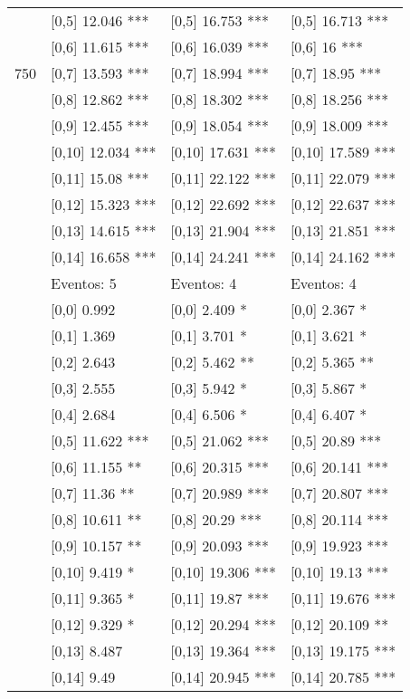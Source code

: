 \begin{table}
\begin{tabular}[t]{llll}
 & {}[0,5] 12.046 *** & {}[0,5] 16.753 *** & {}[0,5] 16.713 ***\\
 & {}[0,6] 11.615 *** & {}[0,6] 16.039 *** & {}[0,6] 16 ***\\
750 & {}[0,7] 13.593 *** & {}[0,7] 18.994 *** & {}[0,7] 18.95 ***\\
\addlinespace
 & {}[0,8] 12.862 *** & {}[0,8] 18.302 *** & {}[0,8] 18.256 ***\\
 & {}[0,9] 12.455 *** & {}[0,9] 18.054 *** & {}[0,9] 18.009 ***\\
 & {}[0,10] 12.034 *** & {}[0,10] 17.631 *** & {}[0,10] 17.589 ***\\
 & {}[0,11] 15.08 *** & {}[0,11] 22.122 *** & {}[0,11] 22.079 ***\\
 & {}[0,12] 15.323 *** & {}[0,12] 22.692 *** & {}[0,12] 22.637 ***\\
\addlinespace
 & {}[0,13] 14.615 *** & {}[0,13] 21.904 *** & {}[0,13] 21.851 ***\\
 & {}[0,14] 16.658 *** & {}[0,14] 24.241 *** & {}[0,14] 24.162 ***\\
 & Eventos:  5 & Eventos:  4 & Eventos:  4\\
 & {}[0,0] 0.992 & {}[0,0] 2.409 * & {}[0,0] 2.367 *\\
 & {}[0,1] 1.369 & {}[0,1] 3.701 * & {}[0,1] 3.621 *\\
\addlinespace
 & {}[0,2] 2.643 & {}[0,2] 5.462 ** & {}[0,2] 5.365 **\\
 & {}[0,3] 2.555 & {}[0,3] 5.942 * & {}[0,3] 5.867 *\\
 & {}[0,4] 2.684 & {}[0,4] 6.506 * & {}[0,4] 6.407 *\\
 & {}[0,5] 11.622 *** & {}[0,5] 21.062 *** & {}[0,5] 20.89 ***\\
 & {}[0,6] 11.155 ** & {}[0,6] 20.315 *** & {}[0,6] 20.141 ***\\
\addlinespace
1000 & {}[0,7] 11.36 ** & {}[0,7] 20.989 *** & {}[0,7] 20.807 ***\\
 & {}[0,8] 10.611 ** & {}[0,8] 20.29 *** & {}[0,8] 20.114 ***\\
 & {}[0,9] 10.157 ** & {}[0,9] 20.093 *** & {}[0,9] 19.923 ***\\
 & {}[0,10] 9.419 * & {}[0,10] 19.306 *** & {}[0,10] 19.13 ***\\
 & {}[0,11] 9.365 * & {}[0,11] 19.87 *** & {}[0,11] 19.676 ***\\
\addlinespace
 & {}[0,12] 9.329 * & {}[0,12] 20.294 *** & {}[0,12] 20.109 **\\
 & {}[0,13] 8.487 & {}[0,13] 19.364 *** & {}[0,13] 19.175 ***\\
 & {}[0,14] 9.49 & {}[0,14] 20.945 *** & {}[0,14] 20.785 ***\\
\bottomrule
\end{tabular}
\end{table}
